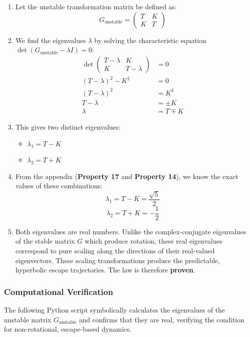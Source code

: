 \begin{enumerate}
    \item Let the unstable transformation matrix be defined as:
    $$ G_{\text{unstable}} = \begin{pmatrix} T & K \\ K & T \end{pmatrix} $$
    
    \item We find the eigenvalues $\lambda$ by solving the characteristic equation $\det(G_{\text{unstable}} - \lambda I) = 0$:
    \begin{align*}
        \det \begin{pmatrix} T-\lambda & K \\ K & T-\lambda \end{pmatrix} &= 0 \\
        (T-\lambda)^2 - K^2 &= 0 \\
        (T-\lambda)^2 &= K^2 \\
        T-\lambda &= \pm K \\
        \lambda &= T \mp K
    \end{align*}
    
    \item This gives two distinct eigenvalues:
    \begin{itemize}
        \item $\lambda_1 = T - K$
        \item $\lambda_2 = T + K$
    \end{itemize}
    
    \item From the appendix (\textbf{Property 17} and \textbf{Property 14}), we know the exact values of these combinations:
    $$ \lambda_1 = T - K = \frac{\sqrt{5}}{2} $$
    $$ \lambda_2 = T + K = -\frac{1}{2} $$
    
    \item Both eigenvalues are real numbers. Unlike the complex-conjugate eigenvalues of the stable matrix $G$ which produce rotation, these real eigenvalues correspond to pure scaling along the directions of their real-valued eigenvectors. These scaling transformations produce the predictable, hyperbolic escape trajectories. The law is therefore \textbf{proven}.
\end{enumerate}

\subsubsection*{Computational Verification}
The following Python script symbolically calculates the eigenvalues of the unstable matrix $G_{\text{unstable}}$ and confirms that they are real, verifying the condition for non-rotational, escape-based dynamics.

